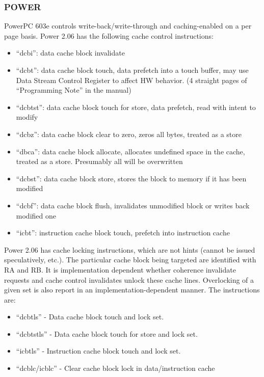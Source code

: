 \subsubsection{POWER}
PowerPC 603e controls write-back/write-through and caching-enabled on a per page basis. 
Power 2.06 has the following cache control instructions:
\begin{itemize}
\item ``dcbi'': data cache block invalidate
\item ``dcbt'': data cache block touch, data prefetch into a touch buffer, may use Data Stream Control Register to affect HW behavior. (4 straight pages of ``Programming Note'' in the manual)
\item ``dcbtst'': data cache block touch for store, data prefetch, read with intent to modify
\item ``dcbz'': data cache block clear to zero, zeros all bytes, treated as a store
\item ``dbca'': data cache block allocate, allocates undefined space in the cache, treated as a store. Presumably all will be overwritten
\item ``dcbst'': data cache block store, stores the block to memory if it has been modified
\item ``dcbf'': data cache block flush, invalidates unmodified block or writes back modified one
\item ``icbt'': instruction cache block touch, prefetch into instruction cache
\end{itemize}

Power 2.06 has cache locking instructions, which are not hints (cannot be issued speculatively, etc.). The particular cache block being targeted are identified with RA and RB. It is implementation dependent whether coherence invalidate requests and cache control invalidates unlock these cache lines. Overlocking of a given set is also report in an implementation-dependent manner. The instructions are:
\begin{itemize}
\item ``dcbtls'' - Data cache block touch and lock set.
\item ``dcbtstls'' - Data cache block touch for store and lock set.
\item ``icbtls'' - Instruction cache block touch and lock set.
\item ``dcblc/icblc'' - Clear cache block lock in data/instruction cache
\end{itemize}

